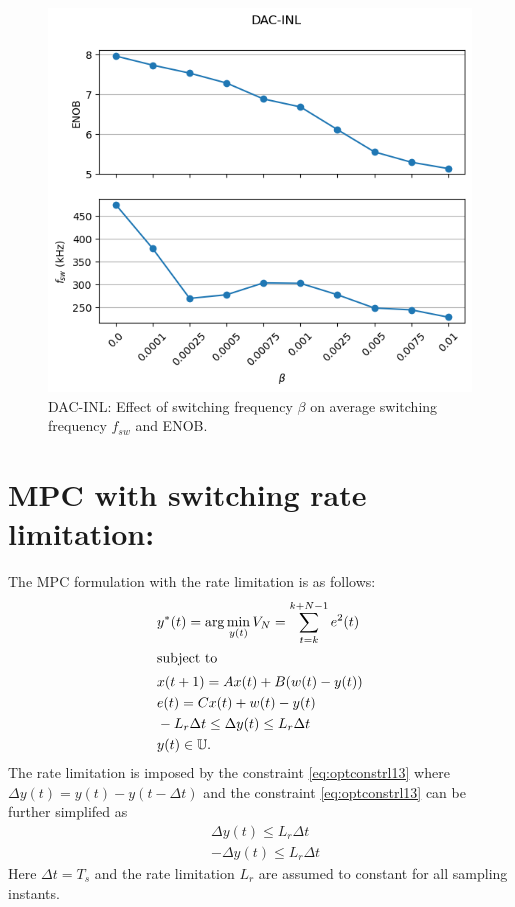 \documentclass[a4paper]{article}
\begin{document}
\begin{figure}[!h]
\begin{minipage}{0.45\linewidth}
		\includegraphics[scale = 0.55]{switch_plots/dac_inl.png}
		\caption{DAC-INL: Effect of switching frequency $\beta$ on average switching frequency $f_{sw}$ and ENOB.}
   \label{fig:fmin_dacinl}
	\end{minipage}
\end{figure}


\clearpage
\section{MPC with switching rate limitation:}
The MPC formulation with the rate limitation is as follows:
\begin{align}
	& y^{\ast}(t) = \arg  \min_{y(t) }	V_{N}  = \sum_{t=k}^{k+N-1} e^{2}(t) \label{eq:optobjrl1}\\
	\intertext{subject to}
	&x(t+1) = A x(t) + B (w(t)-y(t))	\label{eq:optconstrl1}	\\
	&e(t) = Cx(t) + w(t)-y(t)	\label{eq:optconstrl2}	\\
	& - L_{r} \Delta t \leq \Delta y(t) \leq L_{r} \Delta t \label{eq:optconstrl13} \\
	&y(t) \in \mathbb{U}. \label{eq:optconstrl4} 
\end{align}
The rate limitation is imposed by the constraint \eqref{eq:optconstrl13}  where $\Delta y (t) = y(t) - y(t-\Delta t) $ and the constraint \eqref{eq:optconstrl13} can be further simplifed as 
\begin{align*}	
&\Delta y(t) \leq  L_{r}\Delta t\\
&- \Delta y(t) \leq  L_{r} \Delta t
\end{align*}
Here $\Delta t = T_{s}$ and the rate limitation $L_{r}$ are assumed to constant for all sampling instants. 
\end{document}
